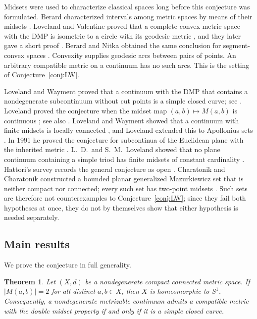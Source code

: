 \documentclass[11pt]{amsart}
\newtheorem{maintheorem}{Theorem}
\theoremstyle{definition}
\theoremstyle{remark}
\newcommand{\M}{M}
\begin{document}
Midsets were used to characterize classical spaces long before this conjecture was formulated. Berard characterized intervals among metric spaces by means of their midsets \cite{Ber71}. Loveland and Valentine proved that a complete convex metric space with the DMP is isometric to a circle with its geodesic metric \cite[Theorem~2]{LV73}, and they later gave a short proof \cite{LV75}. Berard and Nitka obtained the same conclusion for segment-convex spaces \cite{BN74}. Convexity supplies geodesic arcs between pairs of points. An arbitrary compatible metric on a continuum has no such arcs. This is the setting of Conjecture~\ref{conj:LW}.

Loveland and Wayment \cite{LW74} proved that a continuum with the DMP that contains a nondegenerate subcontinuum without cut points is a simple closed curve; see \cite[Theorem~6]{H01}. Loveland proved the conjecture when the midset map $(a,b)\mapsto\M(a,b)$ is continuous \cite[Theorem~3]{L76}; see also \cite[Theorem~3.4]{L76b}. Loveland and Wayment showed that a continuum with finite midsets is locally connected \cite[Lemma~2]{LW74}, and Loveland extended this to Apollonius sets \cite[Lemma~2.2]{L76b}. In 1991 he proved the conjecture for subcontinua of the Euclidean plane with the inherited metric \cite{L91}. L.~D.\ and S.~M.\ Loveland showed that no plane continuum containing a simple triod has finite midsets of constant cardinality \cite[Theorem~3.1]{LL92}. Hattori's survey records the general conjecture as open \cite[p.~158]{H01}. Charatonik and Charatonik constructed a bounded planar generalized Mazurkiewicz set that is neither compact nor connected; every such set has two-point midsets \cite{CC00}. Such sets are therefore not counterexamples to Conjecture~\ref{conj:LW}; since they fail both hypotheses at once, they do not by themselves show that either hypothesis is needed separately.

\subsection{Main results}
We prove the conjecture in full generality.

\begin{maintheorem}\label{thm:A}
Let $(X,d)$ be a nondegenerate compact connected metric space. If $|\M(a,b)|=2$ for all distinct $a,b\in X$, then $X$ is homeomorphic to $S^1$. Consequently, a nondegenerate metrizable continuum admits a compatible metric with the double midset property if and only if it is a simple closed curve.
\end{maintheorem}
\end{document}
